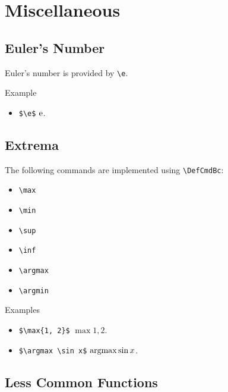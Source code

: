 \section{Miscellaneous}

\subsection{Euler's Number}

Euler's number is provided by \verb|\e|.

\begin{myframe}{Example }
    \begin{itemize}
        \item \verb|$\e$| \produces{} $\mathrm{e}$.
    \end{itemize}
\end{myframe}

\subsection{Extrema}

The following commands are implemented using \verb|\DefCmdBc|:

\begin{multicols}{3}
    \begin{itemize}
        \item \verb|\max|
        \item \verb|\min|
        \item \verb|\sup|
        \item \verb|\inf|
        \item \verb|\argmax|
        \item \verb|\argmin|
    \end{itemize}
\end{multicols}

\begin{myframe}{Examples}
    \begin{itemize}
        \item \verb|$\max{1, 2}$| \produces{} $\max{1, 2}$.
        \item \verb|$\argmax \sin x$| \produces{} $\argmax \sin x$.
    \end{itemize}
\end{myframe}

\subsection{Less Common Functions}

